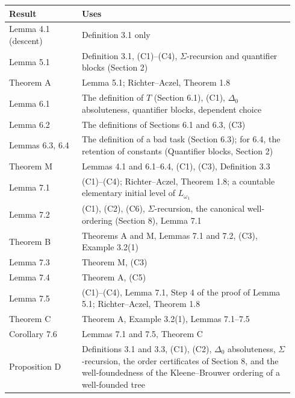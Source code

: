 \documentclass[11pt]{article}
\begin{document}
\begin{center}\begin{tabular}{p{0.24\linewidth}p{0.70\linewidth}}
\toprule
Result & Uses \\
\midrule
Lemma 4.1 (descent) & Definition 3.1 only \\
Lemma 5.1 & Definition 3.1, (C1)--(C4), $\Sigma$-recursion and quantifier blocks (Section 2) \\
Theorem A & Lemma 5.1; Richter--Aczel, Theorem 1.8 \\
Lemma 6.1 & The definition of $T$ (Section 6.1), (C1), $\Delta_0$ absoluteness, quantifier blocks, dependent choice \\
Lemma 6.2 & The definitions of Sections 6.1 and 6.3, (C3) \\
Lemmas 6.3, 6.4 & The definition of a bad task (Section 6.3); for 6.4, the retention of constants (Quantifier blocks,
Section 2) \\
Theorem M & Lemmas 4.1 and 6.1--6.4, (C1), (C3), Definition 3.3 \\
Lemma 7.1 & (C1)--(C4); Richter--Aczel, Theorem 1.8; a countable elementary initial level of $L_{\omega_1}$ \\
Lemma 7.2 & (C1), (C2), (C6), $\Sigma$-recursion, the canonical well-ordering (Section 8), Lemma 7.1 \\
Theorem B & Theorems A and M, Lemmas 7.1 and 7.2, (C3), Example 3.2(1) \\
Lemma 7.3 & Theorem M, (C3) \\
Lemma 7.4 & Theorem A, (C5) \\
Lemma 7.5 & (C1)--(C4), Lemma 7.1, Step 4 of the proof of Lemma 5.1; Richter--Aczel, Theorem 1.8 \\
Theorem C & Theorem A, Example 3.2(1), Lemmas 7.1--7.5 \\
Corollary 7.6 & Lemmas 7.1 and 7.5, Theorem C \\
Proposition D & Definitions 3.1 and 3.3, (C1), (C2), $\Delta_0$ absoluteness, $\Sigma$-recursion, the order
certificates of Section 8, and the
well-foundedness of the Kleene--Brouwer ordering of a well-founded tree \\
\bottomrule
\end{tabular}\end{center}
\end{document}

